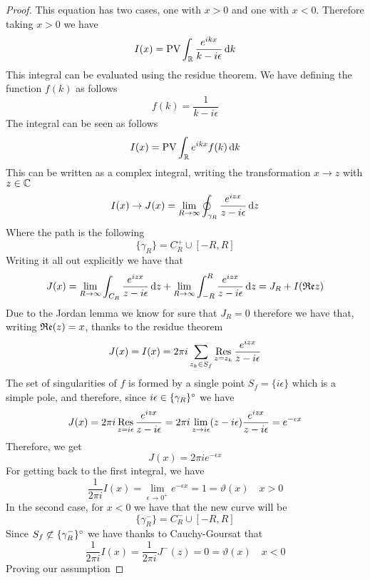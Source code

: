\documentclass[../complete.tex]{subfiles}
\begin{document}
\begin{proof}
	This equation has two cases, one with $x>0$ and one with $x<0$. Therefore taking $x>0$ we have
	\begin{equation*}
		I(x)=\operatorname{\mathrm{PV}}\int_{\mathbb{R}}^{}\frac{e^{ikx}}{k-i\epsilon}\operatorname{d\!} k
	\end{equation*}
	This integral can be evaluated using the residue theorem. We have defining the function $f(k)$ as follows
	\begin{equation*}
		f(k)=\frac{1}{k-i\epsilon}
	\end{equation*}
	The integral can be seen as follows
	\begin{equation*}
		I(x)=\operatorname{\mathrm{PV}}\int_{\mathbb{R}}^{}e^{ikx}f(k)\operatorname{d\!} k
	\end{equation*}
	This can be written as a complex integral, writing the transformation $x\to z$ with $z\in\mathbb{C}$
	\begin{equation*}
		I(x)\to J(x)=\lim_{R\to\infty}\oint_{\gamma_R}\frac{e^{izx}}{z-i\epsilon}\operatorname{d\!} z
	\end{equation*}
	Where the path is the following
	\begin{equation*}
		\{\gamma_R\}=C_R^+\cup[-R,R]
	\end{equation*}
	Writing it all out explicitly we have that
	\begin{equation*}
		J(x)=\lim_{R\to\infty}\int_{C_R}\frac{e^{izx}}{z-i\epsilon}\operatorname{d\!} z+\lim_{R\to\infty}\int_{-R}^{R}\frac{e^{izx}}{z-i\epsilon}\operatorname{d\!} z=J_R+I(\mathfrak{Re}{z})
	\end{equation*}
	Due to the Jordan lemma we know for sure that $J_R=0$ therefore we have that, writing $\mathfrak{Re}(z)=x$, thanks to the residue theorem
	\begin{equation*}
		J(x)=I(x)=2\pi i\sum_{z_k\in S_f}\operatorname*{\mathrm{Res}}_{z=z_k}\frac{e^{izx}}{z-i\epsilon}
	\end{equation*}
	The set of singularities of $f$ is formed by a single point $S_f=\{i\epsilon\}$ which is a simple pole, and therefore, since $i\epsilon\in\{\gamma_R\}^{\circ}$ we have
	\begin{equation*}
		J(x)=2\pi i\operatorname*{\mathrm{Res}}_{z=i\epsilon}\frac{e^{izx}}{z-i\epsilon}=2\pi i\lim_{z\to i\epsilon}(z-i\epsilon)\frac{e^{izx}}{z-i\epsilon}=e^{-\epsilon x}
	\end{equation*}
	Therefore, we get
	\begin{equation*}
		J(x)=2\pi ie^{-\epsilon x}
	\end{equation*}
	For getting back to the first integral, we have
	\begin{equation*}
		\frac{1}{2\pi i}I(x)=\lim_{\epsilon\to0^+}e^{-\epsilon x}=1=\vartheta(x)\quad x>0
	\end{equation*}
	In the second case, for $x<0$ we have that the new curve will be
	\begin{equation*}
		\{\gamma_R^-\}=C_R^-\cup[-R,R]
	\end{equation*}
	Since $S_f\not\subset\{\gamma_R^-\}^{\circ}$ we have thanks to Cauchy-Goursat that
	\begin{equation*}
		\frac{1}{2\pi i}I(x)=\frac{1}{2\pi i}J^-(z)=0=\vartheta(x)\quad x<0
	\end{equation*}
	Proving our assumption
\end{proof}
\end{document}
